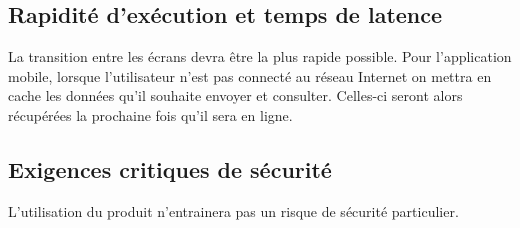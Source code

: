 \subsection{Rapidité d'exécution et temps de latence}
La transition entre les écrans devra être la plus rapide possible. Pour l'application mobile, lorsque l'utilisateur n'est pas connecté au réseau Internet on mettra en cache les données qu'il souhaite envoyer et consulter. Celles-ci seront alors récupérées la prochaine fois qu'il sera en ligne.

\subsection{Exigences critiques de sécurité}
L'utilisation du produit n'entrainera pas un risque de sécurité particulier.
